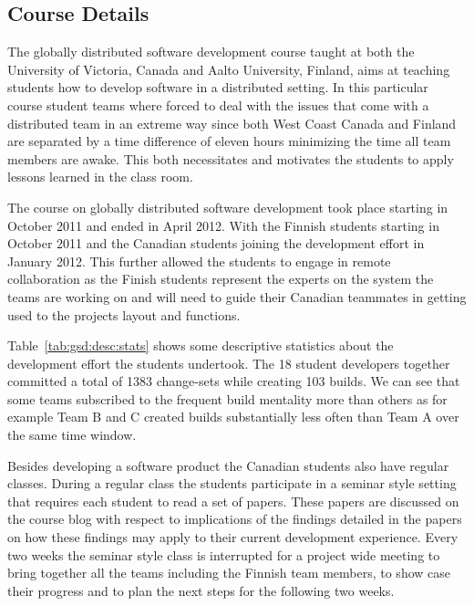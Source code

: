 
\subsection{Course Details}
The globally distributed software development course taught at both the University of Victoria, Canada and Aalto University, Finland, aims at teaching students how to develop software in a distributed setting.
In this particular course student teams where forced to deal with the issues that come with a distributed team in an extreme way since both West Coast Canada and Finland are separated by a time difference of eleven hours minimizing the time all team members are awake.
This both necessitates and motivates the students to apply lessons learned in the class room.

The course on globally distributed software development took place starting in October 2011 and ended in April 2012.
With the Finnish students starting in October 2011 and the Canadian students joining the development effort in January 2012.
This further allowed the students to engage in remote collaboration as the Finish students represent the experts on the system the teams are working on and will need to guide their Canadian teammates in getting used to the projects layout and functions.

Table~\ref{tab:gsd:desc:stats} shows some descriptive statistics about the development effort the students undertook.
The 18 student developers together committed a total of 1383 change-sets while creating 103 builds.
We can see that some teams subscribed to the frequent build mentality more than others as for example Team B and C created builds substantially less often than Team A over the same time window.

Besides developing a software product the Canadian students also have regular classes.
During a regular class the students participate in a seminar style setting that requires each student to read a set of papers.
These papers are discussed on the course blog with respect to implications of the findings detailed in the papers on how these findings may apply to their current development experience.
Every two weeks the seminar style class is interrupted for a project wide meeting to bring together all the teams including the Finnish team members, to show case their progress and to plan the next steps for the following two weeks.

